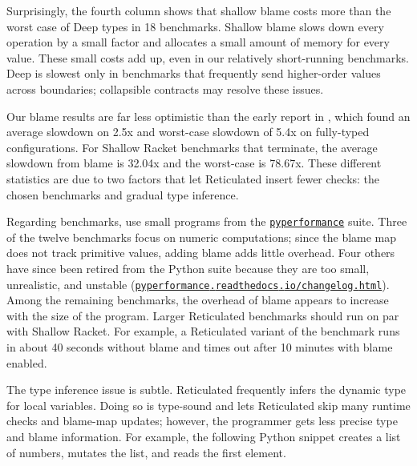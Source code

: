 \documentclass[ twoside,open=right,titlepage,numbers=noenddot,headinclude,%
                footinclude=true,cleardoublepage=empty,abstract=off,
                BCOR=5mm,paper=a4,fontsize=11pt,%
                ngerman,american,%
                parts,pdfspacing]{scrreprt}
\newcommand{\Scribtexttt}[1]{{\texttt{#1}}}
\begin{document}
Surprisingly, the fourth column shows that shallow blame costs
 more than the worst case of Deep types in 18 benchmarks.
Shallow blame slows down every operation by a small factor
 and allocates a small amount of memory for every value.
These small costs add up, even in our relatively short{-}running benchmarks.
Deep is slowest only in benchmarks that frequently send higher{-}order
 values across boundaries; collapsible contracts may resolve these issues.

Our blame results are far less optimistic than the early report in
 , which found an average slowdown on 2.5x and
 worst{-}case slowdown of 5.4x on fully{-}typed configurations.
For Shallow Racket benchmarks that terminate, the average slowdown
 from blame is 32.04x
 and the worst{-}case is 78.67x.
These different statistics are due to two factors that let Reticulated
 insert fewer checks: the chosen benchmarks and gradual type inference.

Regarding benchmarks,  use small programs from the
 \href{https://pyperformance.readthedocs.io/}{\Scribtexttt{pyperformance}} suite.
Three of the twelve benchmarks
focus on numeric computations; since the blame map does not track primitive
values, adding blame adds little overhead.
Four others have since been retired from the Python suite because they are
 too small, unrealistic, and unstable (\href{https://pyperformance.readthedocs.io/changelog.html}{\Scribtexttt{pyperformance{\hbox{\texttt{.}}}readthedocs{\hbox{\texttt{.}}}io/changelog{\hbox{\texttt{.}}}html}}).
Among the remaining benchmarks, the overhead of blame appears to increase with
 the size of the program.
Larger Reticulated benchmarks should run on par with Shallow Racket.
For example, a Reticulated variant of the  benchmark
 runs in about 40 seconds without blame and times out after 10 minutes with
 blame enabled.

The type inference issue is subtle.
Reticulated frequently infers the dynamic type for local variables.
Doing so is type{-}sound and lets Reticulated skip many runtime checks
 and blame{-}map updates; however, the programmer gets less precise type
 and blame information.
For example, the following Python snippet creates a list of numbers,
 mutates the list, and reads the first element.

\end{document}
